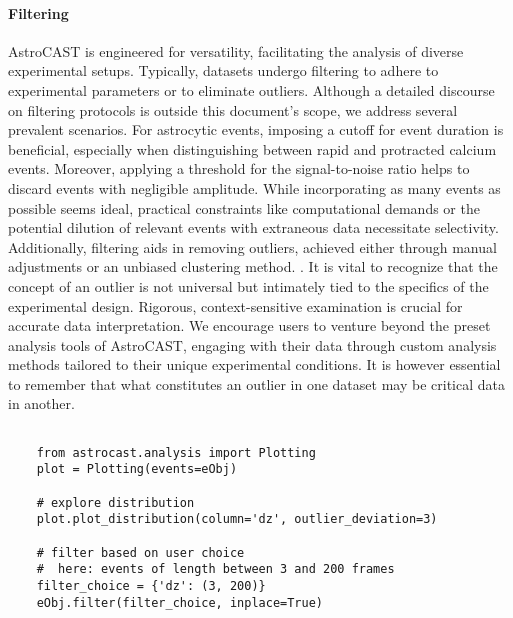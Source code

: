 
\paragraph{Filtering}
AstroCAST is engineered for versatility, facilitating the analysis of diverse experimental setups. Typically, datasets undergo filtering to adhere to experimental parameters or to eliminate outliers. Although a detailed discourse on filtering protocols is outside this document's scope, we address several prevalent scenarios. For astrocytic events, imposing a cutoff for event duration is beneficial, especially when distinguishing between rapid and protracted calcium events. Moreover, applying a threshold for the signal-to-noise ratio helps to discard events with negligible amplitude. While incorporating as many events as possible seems ideal, practical constraints like computational demands or the potential dilution of relevant events with extraneous data necessitate selectivity. Additionally, filtering aids in removing outliers, achieved either through manual adjustments or an unbiased clustering method. . It is vital to recognize that the concept of an outlier is not universal but intimately tied to the specifics of the experimental design. Rigorous, context-sensitive examination is crucial for accurate data interpretation. We  encourage users to venture beyond the preset analysis tools of AstroCAST, engaging with their data through custom analysis methods tailored to their unique experimental conditions. It is however essential to remember that what constitutes an outlier in one dataset may be critical data in another.

\begin{lstlisting}[style=pyStyle]

    from astrocast.analysis import Plotting
    plot = Plotting(events=eObj)

    # explore distribution
    plot.plot_distribution(column='dz', outlier_deviation=3)

    # filter based on user choice
    #  here: events of length between 3 and 200 frames
    filter_choice = {'dz': (3, 200)}
    eObj.filter(filter_choice, inplace=True)

\end{lstlisting}

